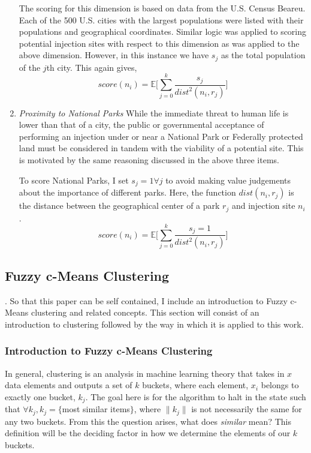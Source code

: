 \documentclass[a4paper, 12pt]{article}
\begin{document}
\begin{enumerate}
The scoring for this dimension is based on data from the U.S. Census Beareu. Each of the 500 U.S. cities with the largest populations were listed with their populations and geographical coordinates. Similar logic was applied to scoring potential injection sites with respect to this dimension as was applied to the above dimension. However, in this instance we have $s_j$ as the total population of the $j$th city. This again gives,
$$score(n_i) =  \mathbb{E}\bigg[\sum_{j=0}^k \frac{s_j}{dist^2(n_i, r_j)}\bigg]$$


\item \emph{Proximity to National Parks} While the immediate threat to human life is lower than that of a city, the public or governmental acceptance of performing an injection under or near a National Park or Federally protected land must be considered in tandem with the viability of a potential site. This is motivated by the same reasoning discussed in the above three items.

To score National Parks, I set $s_j = 1 \forall j$ to avoid making value judgements about the importance of different parks. Here, the function $dist(n_i, r_j)$ is the distance between the geographical center of a park $r_j$ and injection site $n_i$.
$$score(n_i) =  \mathbb{E}\bigg[\sum_{j=0}^k \frac{s_j = 1}{dist^2(n_i, r_j)}\bigg]$$

\end{enumerate} 



\subsection{Fuzzy c-Means Clustering}\label{fuzz}.
So that this paper can be self contained, I include an introduction to Fuzzy c-Means clustering and related concepts. This section will consist of an introduction to clustering followed by the way in which it is applied to this work.

\subsubsection{Introduction to Fuzzy c-Means Clustering}
\par In general, clustering is an analysis in machine learning theory that takes in $x$ data elements and outputs a set of $k$ buckets, where each element, $x_i$ belongs to exactly one bucket, $k_j$. The goal here is for the algorithm to halt in the state such that $\forall k_j, k_j = \{$most similar items$\}$, where $\|k_j\|$ is not necessarily the same for any two buckets. From this the question arises, what does \emph{similar} mean? This definition will be the deciding factor in how we determine the elements of our $k$ buckets.   
\end{document}
